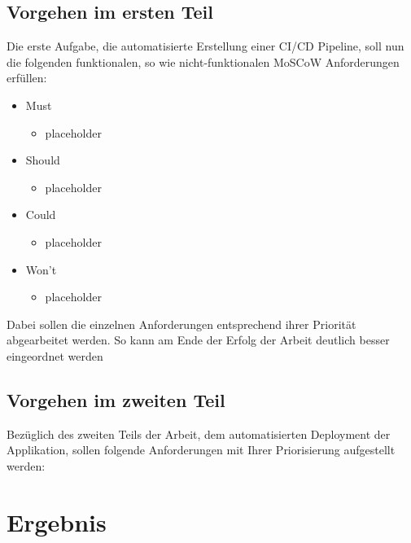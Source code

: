 \documentclass[12pt, a4paper]{scrbook}
\begin{document}
\section{Vorgehen im ersten Teil}
Die erste Aufgabe, die automatisierte Erstellung einer CI/CD Pipeline, soll nun die folgenden funktionalen, so wie nicht-funktionalen MoSCoW Anforderungen erfüllen:
\begin{itemize}
\item Must
\begin{itemize}
\item placeholder
\end{itemize}
\item Should
\begin{itemize}
\item placeholder
\end{itemize}
\item Could
\begin{itemize}
\item placeholder
\end{itemize}
\item Won't
\begin{itemize}
\item placeholder
\end{itemize}
\end{itemize}
Dabei sollen die einzelnen Anforderungen entsprechend ihrer Priorität abgearbeitet werden. So kann am Ende der Erfolg der Arbeit deutlich besser eingeordnet werden
\section{Vorgehen im zweiten Teil}
Bezüglich des zweiten Teils der Arbeit, dem automatisierten Deployment der Applikation, sollen folgende Anforderungen mit Ihrer Priorisierung aufgestellt werden:

\let\cleardoublepage\relax
\chapter{Ergebnis}
\end{document}
